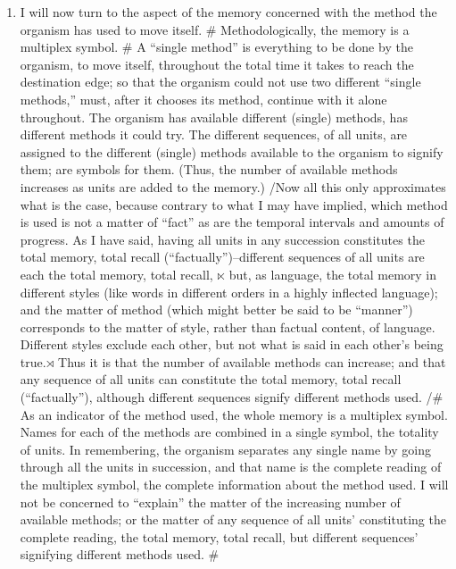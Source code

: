 \begin{enumerate}[wide, nosep, itemsep=0.5em]
\item I will now turn to the aspect of the memory concerned with the 
method the organism has used to move itself. \# Methodologically, the 
memory is a multiplex symbol. \# A \enquote{single method} is everything to be done 
by the organism, to move itself, throughout the total time it takes to reach 
the destination edge; so that the organism could not use two different 
\enquote{single methods,} must, after it chooses its method, continue with it alone 
throughout. The organism has available different (single) methods, has 
different methods it could try. The different sequences, of all units, are 
assigned to the different (single) methods available to the organism to signify 
them; are symbols for them. (Thus, the number of available methods 
increases as units are added to the memory.) \slash Now all this only approximates 
what is the case, because contrary to what I may have implied, which 
method is used is not a matter of \enquote{fact} as are the temporal intervals and 
amounts of progress. As I have said, having all units in any succession 
constitutes the total memory, total recall (\enquote{factually})--different sequences 
of all units are each the total memory, total recall, $\ltimes$ but, as language, the 
total memory in different styles (like words in different orders in a highly 
inflected language); and the matter of method (which might better be said to 
be \enquote{manner}) corresponds to the matter of style, rather than factual 
content, of language. Different styles exclude each other, but not what is 
said in each other's being true.$\rtimes$ Thus it is that the number of available 
methods can increase; and that any sequence of all units can constitute the 
total memory, total recall (\enquote{factually}), although different sequences signify 
different methods used. \slash \# As an indicator of the method used, the whole 
memory is a multiplex symbol. Names for each of the methods are combined 
in a single symbol, the totality of units. In remembering, the organism 
separates any single name by going through all the units in succession, and 
that name is the complete reading of the multiplex symbol, the complete 
information about the method used. I will not be concerned to \enquote{explain} 
the matter of the increasing number of available methods; or the matter of 
any sequence of all units' constituting the complete reading, the total 
memory, total recall, but different sequences' signifying different methods 
used. \#


\end{enumerate}
